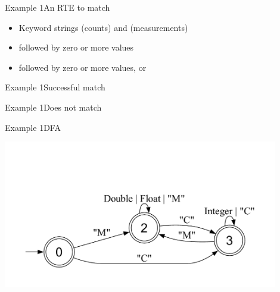 \newsavebox\exampleAbox
\begin{lrbox}{\exampleAbox}
  \begin{minipage}{12cm}
    
  \end{minipage}
\end{lrbox}



\begin{frame}{Example 1}{An RTE to match}
  \usebox\exampleAbox

  \begin{itemize}
  \item Keyword strings  (counts) and  (measurements)
  \item {} followed by zero or more  values
  \item {} followed by zero or more values,  or 
  \end{itemize}
\end{frame}

\newsavebox\exampleAbbox
\begin{lrbox}{\exampleAbbox}
  \begin{minipage}{12cm}
    
  \end{minipage}
\end{lrbox}



\begin{frame}{Example 1}{Successful match}
  \usebox\exampleAbbox
\end{frame}

\newsavebox\exampleAcbox
\begin{lrbox}{\exampleAcbox}
  \begin{minipage}{12cm}
    
  \end{minipage}
\end{lrbox}



\begin{frame}{Example 1}{Does not match}
  \usebox\exampleAcbox
\end{frame}

\newsavebox\exampleAdbox
\begin{lrbox}{\exampleAdbox}
  \begin{minipage}{12cm}
    
  \end{minipage}
\end{lrbox}


\begin{frame}{Example 1}{DFA}
  \usebox\exampleAdbox
  
  \includegraphics[width=0.9\textwidth]{example2.pdf}
\end{frame}
